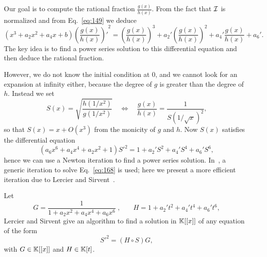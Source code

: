 Our goal is to compute the rational fraction $\frac{g(x)}{h(x)}$. From
the fact that $\mathcal{I}$ is normalized and from Eq.~\eqref{eq:149} we deduce
\begin{equation}
  \label{eq:166}
  (x^3 + a_2x^2 + a_4x + b){\left(\frac{g(x)}{h(x)}\right)'}^2 =
  \left(\frac{g(x)}{h(x)}\right)^3 + a_2'\left(\frac{g(x)}{h(x)}\right)^2 + a_4'\frac{g(x)}{h(x)} + a_6'
  \text{.}
\end{equation}
The key idea is to find a power series solution to this differential
equation and then deduce the rational fraction.

  However, we do not
know the initial condition at $0$, and we cannot look for an expansion
at infinity either, because the degree of $g$ is greater than the
degree of $h$.  Instead we set
\begin{equation}
  \label{eq:167}
  S(x) = \sqrt{\frac{h(1/x^2)}{g(1/x^2)}}
  \quad\Leftrightarrow\quad
  \frac{g(x)}{h(x)} = \frac{1}{S(1/\sqrt{x})^2}
  \text{,}
\end{equation}
so that $S(x) = x + O(x^3)$ from the monicity of $g$ and $h$. Now
$S(x)$ satisfies the differential equation
\begin{equation}
  \label{eq:168}
  (a_6x^6 + a_4x^4 + a_2x^2 + 1){S'}^2 = 1 + a_2'S^2 + a_4'S^4 + a_6'S^6
  \text{,}
\end{equation}
hence we can use a Newton iteration to find a power series
solution. In~\cite[2.4]{bostan+morain+salvy+schost08}, a generic
iteration to solve Eq.~\eqref{eq:168} is used; here we present a more
efficient iteration due to Lercier and
Sirvent~\cite{lercier+sirvent08}.

Let 
\begin{equation}
  \label{eq:169}
  G = \frac{1}{1 + a_2x^2 + a_4x^4 + a_6x^6}
  \;\text{,}\qquad
  H = 1 + a_2't^2 + a_4't^4 + a_6't^6
  \text{,}
\end{equation}
Lercier and Sirvent give an algorithm to find a solution in $\mathbb{K}[[x]]$
of any equation of the form
\begin{equation}
  \label{eq:170}
  {S'}^2 = (H\circ S)G
  \text{,}
\end{equation}
with $G\in\mathbb{K}[[x]]$ and $H\in\mathbb{K}[t]$.


